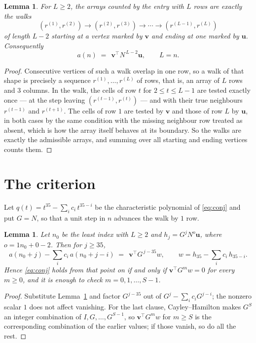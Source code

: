 \documentclass[11pt,a4paper]{article}
\theoremstyle{plain}
\newtheorem{lemma}[theorem]{Lemma}
\theoremstyle{definition}
\begin{document}
\begin{lemma}\label{lem:walk}
For $L\ge2$, the arrays counted by the entry with $L$ rows are exactly the walks
\[
(r^{(1)},r^{(2)})\to(r^{(2)},r^{(3)})\to\cdots\to(r^{(L-1)},r^{(L)})
\]
of length $L-2$ starting at a vertex marked by $\mathbf{v}$ and ending at one marked by
$\mathbf{u}$. Consequently
\[
a(n)\;=\;\,\mathbf{v}^{\!\top}N^{\,L-2}\mathbf{u},\qquad L=n .
\]
\end{lemma}

\begin{proof}
Consecutive vertices of such a walk overlap in one row, so a walk of that shape is
precisely a sequence $r^{(1)},\dots,r^{(L)}$ of rows, that is, an array of $L$ rows
and $3$ columns. In the walk, the cells of row $t$ for $2\le t\le L-1$ are tested
exactly once --- at the step leaving $(r^{(t-1)},r^{(t)})$ --- and with their true
neighbours $r^{(t-1)}$ and $r^{(t+1)}$. The cells of row $1$ are tested by
$\mathbf{v}$ and those of row $L$ by $\mathbf{u}$, in both cases by the same condition
with the missing neighbour row treated as absent, which is how the array itself behaves at
its boundary. So the walks are exactly the admissible arrays, and summing over all starting
and ending vertices counts them.
\end{proof}

\section{The criterion}

Let $q(t)=t^{35}-\sum_i c_i\,t^{35-i}$ be the characteristic polynomial of
\eqref{eq:conj} and put $G=N$, so that a unit step in $n$ advances the walk by
$1$ row.

\begin{lemma}\label{lem:crit}
Let $n_0$ be the least index with $L\ge2$ and $h_j=G^{j}N^{o}\mathbf{u}$, where
$o=1n_0+0-2$. Then for $j\ge35$,
\[
a(n_0+j)-\sum_i c_i\,a(n_0+j-i)\;=\;\,\mathbf{v}^{\!\top}G^{\,j-35}w,
\qquad w=h_{35}-\sum_i c_i\,h_{35-i} .
\]
Hence \eqref{eq:conj} holds from that point on if and only if
$\mathbf{v}^{\!\top}G^{m}w=0$ for every $m\ge0$, and it is enough to check
$m=0,1,\dots,S-1$.
\end{lemma}

\begin{proof}
Substitute Lemma~\ref{lem:walk} and factor $G^{j-35}$ out of
$G^{j}-\sum_ic_iG^{j-i}$; the nonzero scalar $1$ does not affect
vanishing. For the last clause, Cayley--Hamilton makes $G^{S}$ an integer combination of
$I,G,\dots,G^{S-1}$, so $\mathbf{v}^{\!\top}G^{m}w$ for $m\ge S$ is the corresponding
combination of the earlier values; if those vanish, so do all the rest.
\end{proof}
\end{document}
